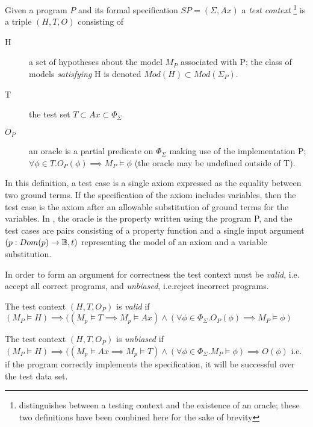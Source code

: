 \begin{df}
Given a program $P$ and its formal specification $SP = (\Sigma, Ax)$ 
a \emph{test context}
\footnote{\cite{Bernot1991} distinguishes between 
a testing context and the existence of an oracle;
these two definitions have been combined here for the sake of brevity}
is a triple $(H, T, O)$ consisting of

\begin{description}
\item[H] { a set of hypotheses about the model $M_P$ associated with P;
the class of models \emph{satisfying} H is denoted $Mod(H) \subset Mod(\Sigma_P)$.
}
\item[T] {the test set $T \subset Ax \subset \Phi_\Sigma$}
\item[$O_P$] {an oracle is a partial predicate on $\Phi_\Sigma$ making use of the implementation P;
$\forall \phi \in T. O_P(\phi) \implies M_P \models \phi$ 
(the oracle may be undefined outside of T).
} 
\end{description}
\end{df}

\noindent
In this definition, a test case is a single axiom expressed
as the equality between two ground terms.
If the specification of the axiom includes variables,
then the test case is the axiom after an allowable substitution of ground terms for the variables.
In \pbt, the oracle is the property written using the program P,
and the test cases are pairs consisting of 
a property function and a single input argument
$(p: Dom(p) \rightarrow \mathbb{B}, t)$ 
representing the model of an axiom and a variable substitution.

In order to form an argument for correctness
the test context must be \emph{valid},
i.e. accept all correct programs,
and \emph{unbiased}, i.e.reject incorrect programs.

\begin{df}
The test context $(H,T,O_P)$ is \emph{valid} if 
$(M_P \models H) \implies ( (M_p \models T \implies M_p \models Ax) \land
(\forall \phi \in \Phi_\Sigma. O_P(\phi) \implies M_P \models \phi)$
\end{df}

\begin{df}
The test  context $(H,T,O_P)$ is \emph{unbiased} if 
$(M_P \models H) \implies ( (M_p \models Ax \implies M_p \models T)
\land (\forall \phi \in \Phi_\Sigma. M_P \models \phi) \implies O(\phi)$
i.e. if the program correctly implements the specification, 
it will be successful over the test data set.
\end{df}

